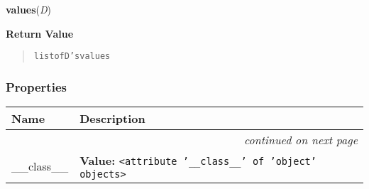     \label{dict:values}

    \vspace{0.5ex}

    \begin{boxedminipage}{\textwidth}

    \raggedright \textbf{values}(\textit{D})

      \textbf{Return Value}
      \begin{quote}
\begin{alltt}
list of D's values
\end{alltt}

      \end{quote}

    \vspace{1ex}

    \end{boxedminipage}



  \subsubsection{Properties}

\begin{longtable}{|p{}|p{}|l}
\cline{1-2}
\cline{1-2} \centering \textbf{Name} & \centering \textbf{Description}& \\
\cline{1-2}
\endhead\cline{1-2}\multicolumn{3}{r}{\small\textit{continued on next page}}\\\endfoot\cline{1-2}
\endlastfoot\raggedright \_\-\_\-c\-l\-a\-s\-s\-\_\-\_\- & \raggedright \textbf{Value:} 
{\tt {\textless}attribute '\_\_class\_\_' of 'object' objects{\textgreater}}&\\
\cline{1-2}
\end{longtable}

